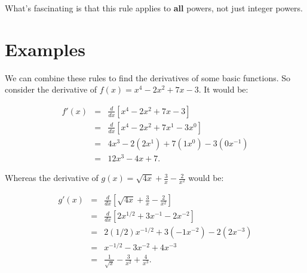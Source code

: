 \documentclass[10pt]{article}
\theoremstyle{definition}
\begin{document}
What's fascinating is that this rule applies to {\bf all} powers, not just integer powers.


\section{Examples}

We can combine these rules to find the derivatives of some basic functions.  So consider the derivative of $f(x)=x^4-2x^2+7x-3$.  It would be:

\begin{eqnarray*}
f'(x)&=&\frac{d}{dx}[x^4-2x^2+7x-3]\\
&=&\frac{d}{dx}[x^4-2x^2+7x^1-3x^0]\\
&=&4x^3-2(2x^1)+7(1x^0)-3(0x^{-1})\\
&=&12x^3-4x+7.
\end{eqnarray*}

Whereas the derivative of $g(x)=\sqrt{4x}+\frac{3}{x}-\frac{2}{x^2}$ would be:

\begin{eqnarray*}
g'(x)&=&\frac{d}{dx}[\sqrt{4x}+\frac{3}{x}-\frac{2}{x^2}]\\
&=&\frac{d}{dx}[2x^{1/2}+3x^{-1}-2x^{-2}]\\
&=&2(1/2)x^{-1/2}+3(-1x^{-2})-2(2x^{-3})\\
&=&x^{-1/2}-3x^{-2}+4x^{-3}\\
&=&\frac{1}{\sqrt{x}}-\frac{3}{x^2}+\frac{4}{x^3}.
\end{eqnarray*}
\end{document}
